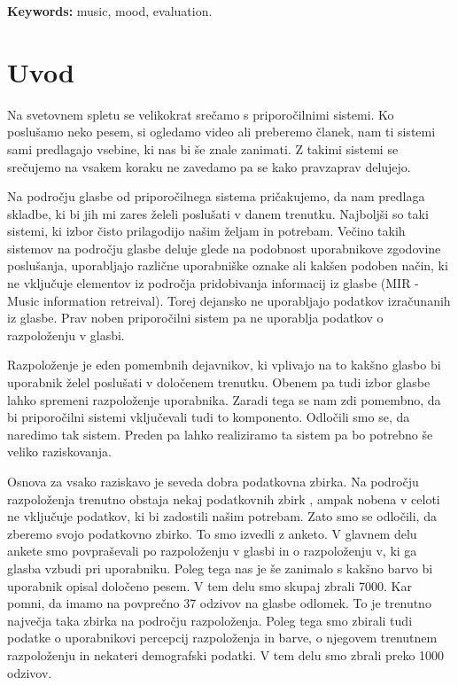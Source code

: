 \documentclass[a4paper, 12pt]{book}
\newcommand{\tkeywordsEn}{music, mood, evaluation}
\newcommand{\clearemptydoublepage}{\newpage{\pagestyle{empty}\cleardoublepage}}
\begin{document}
{\noindent\textbf{Keywords:} \tkeywordsEn.
\clearemptydoublepage

\mainmatter
\setcounter{page}{1}
\pagestyle{fancy}


\chapter{Uvod}

Na svetovnem spletu se velikokrat srečamo s priporočilnimi sistemi. Ko poslušamo neko pesem, si ogledamo video ali preberemo članek, nam ti sistemi sami predlagajo vsebine, ki nas bi še znale zanimati. Z takimi sistemi se srečujemo na vsakem koraku ne zavedamo pa se kako pravzaprav delujejo. 

Na področju glasbe od priporočilnega sistema pričakujemo, da nam predlaga skladbe, ki bi jih mi zares želeli poslušati v danem trenutku. Najboljši so taki sistemi, ki izbor čisto prilagodijo našim željam in potrebam. Večino takih sistemov na področju glasbe deluje glede na podobnost uporabnikove zgodovine poslušanja, uporabljajo različne uporabniške oznake ali kakšen podoben način, ki ne vključuje elementov iz področja pridobivanja informacij iz glasbe (MIR - Music information retreival). Torej dejansko ne uporabljajo podatkov izračunanih iz glasbe. Prav noben priporočilni sistem pa ne uporablja podatkov o razpoloženju v glasbi. 

Razpoloženje je eden pomembnih dejavnikov, ki vplivajo na to kakšno glasbo bi uporabnik želel poslušati v določenem trenutku. Obenem pa tudi izbor glasbe lahko spremeni razpoloženje uporabnika. Zaradi tega se nam zdi pomembno, da bi priporočilni sistemi vključevali tudi to komponento. Odločili smo se, da naredimo tak sistem. Preden pa lahko realiziramo ta sistem pa bo potrebno še veliko raziskovanja. 

Osnova za vsako raziskavo je seveda dobra podatkovna zbirka. Na področju razpoloženja trenutno obstaja nekaj podatkovnih zbirk\cite{eerola2010comparison} \cite{schmidt2011modeling} \cite{turnbull2008semantic} \cite{schuller2010mister} \cite{panda2013multi}, ampak nobena v celoti ne vključuje podatkov, ki bi zadostili našim potrebam. Zato smo se odločili, da zberemo svojo podatkovno zbirko. To smo izvedli z anketo. V glavnem delu ankete smo povpraševali po razpoloženju v glasbi in o razpoloženju v, ki ga glasba vzbudi pri uporabniku. Poleg tega nas je še zanimalo s kakšno barvo bi uporabnik opisal določeno pesem. V tem delu smo skupaj zbrali 7000. Kar pomni, da imamo na povprečno 37 odzivov na glasbe odlomek. To je trenutno največja taka zbirka na področju razpoloženja. Poleg tega smo zbirali tudi podatke o uporabnikovi percepcij razpoloženja in barve, o njegovem trenutnem razpoloženju in nekateri demografski podatki. V tem delu smo zbrali preko 1000 odzivov. 

}
\end{document}
